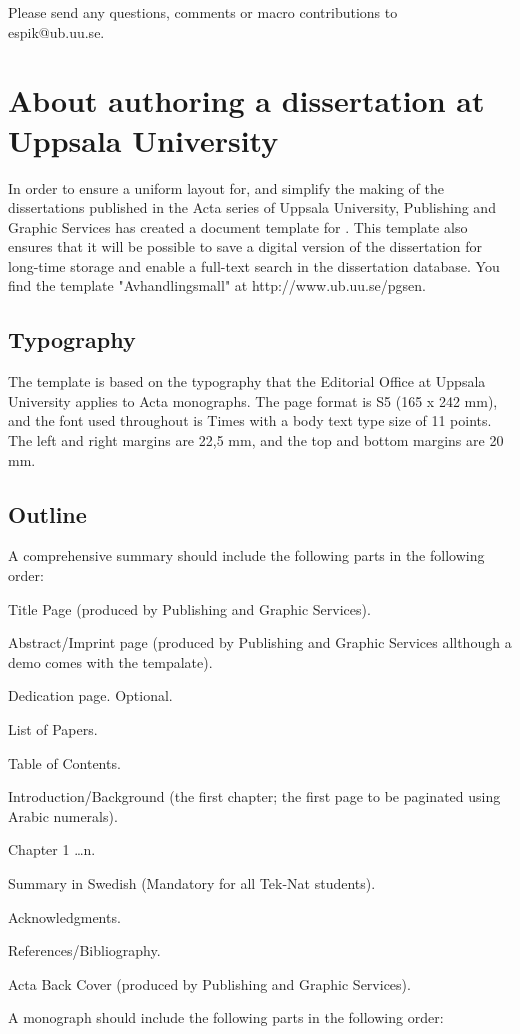 \vspace{\baselineskip}
\noindent Please send any questions, comments or macro contributions to\\espik@ub.uu.se.

\chapter[About authoring a dissertation at Uppsala University]{About authoring a dissertation \linebreak[3]at Uppsala University}
In order to ensure a uniform layout for, and simplify the making of the dissertations published in the Acta series of Uppsala
University, Publishing and Graphic Services has created a document template for \LaTeXe{}. This template also ensures that it will be possible to save a digital version of the dissertation for long-time storage and enable a full-text search in the dissertation
database. You find the template "Avhandlingsmall" at http://www.ub.uu.se/pgsen.
\section{Typography}
The template is based on the typography that the Editorial Office at Uppsala University applies to Acta
monographs. The page format is S5 (165 x 242 mm), and the font used throughout is Times with a body text type size of 11 points. The left and right margins are 22,5 mm, and the top and bottom margins are 20 mm.
\section{Outline}
A comprehensive summary should include the following parts in the following order:
\begin{bulletlist}
    \item Title Page (produced by Publishing and Graphic Services).
    \item Abstract/Imprint page (produced by Publishing and Graphic Services all\-though a demo comes with the tempalate).
    \item Dedication page. Optional.
    \item List of Papers.
    \item Table of Contents.
    \item Introduction/Background (the first chapter; the first page to be paginated using Arabic numerals).
    \item Chapter 1 \ldots n.
    \item Summary in Swedish (Mandatory for all Tek-Nat students).
    \item Acknowledgments.
    \item References/Bibliography.
    \item Acta Back Cover (produced by Publishing and Graphic Services).
\end{bulletlist}
\vspace{1\baselineskip}
A monograph should include the following parts in the following order:

